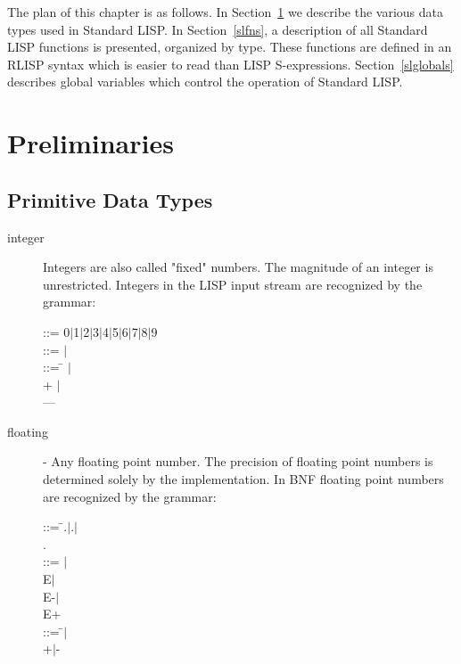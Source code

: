 \documentclass[11pt,letterpaper]{book}
\begin{document}
The plan of this chapter is as follows. In Section~\ref{dtypes} we
describe the various data types used in Standard LISP. In
Section~\ref{slfns}, a description of all Standard LISP functions is
presented, organized by type. These functions are defined in an RLISP
syntax which is easier to read than LISP S-expressions.
Section~\ref{slglobals} describes global variables which control the
operation of Standard LISP.


\section{Preliminaries}
\label{dtypes}
\subsection{Primitive Data Types}
\label{pdat}
\begin{description}
\item[integer] Integers are also called "fixed" numbers. The magnitude of
an integer is unrestricted. Integers in the LISP input stream are
 
recognized by the grammar:

\begin{tabbing}
 ::= 0$\mid$1$\mid$2$\mid$3$\mid$4$\mid$5$\mid$6$\mid$7$\mid$8$\mid$9
\\
 ::= $\mid$ \\
 ::= \=  $\mid$ \\
\> + $\mid$ \\
\> ---
\end{tabbing}

\item[floating] - Any floating point number. The precision of floating point
numbers is determined solely by the implementation. In BNF floating
point numbers are recognized by the grammar:

\begin{tabbing}
 ::=  \= .$\mid$.$\mid$ \\
\> . \\
\>  ::= $\mid$ \\
\> E$\mid$ \\
\> E-$\mid$ \\
\> E+ \\
 ::= \= $\mid$ \\
\> +$\mid$-
\end{tabbing}


\end{description}
\end{document}
